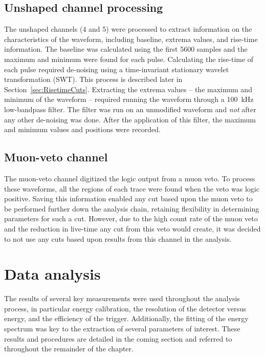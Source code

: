 		\subsection{Unshaped channel processing}
		\label{sec:UnshapedWFProc}

The unshaped channels (4 and 5) were processed to extract information on the characteristics of the waveform, including baseline, extrema values, and rise-time information.    The baseline was calculated using the first 5600 samples and the maximum and minimum were found for each pulse.  Calculating the rise-time of each pulse required de-noising using a time-invariant stationary wavelet transformation (SWT).  This process is described later in Section~\ref{sec:RisetimeCuts}.  Extracting the extrema values -- the maximum and minimum of the waveform -- required running the waveform through a 100~kHz low-bandpass filter.  The filter was run on an unmodified waveform and \emph{not} after any other de-noising was done.  After the application of this filter, the maximum and minimum values and positions were recorded.  

		\subsection{Muon-veto channel}
		\label{sec:MuonProc}

The muon-veto channel digitized the logic output from a muon veto.  To process these waveforms, all the regions of each trace were found when the veto was logic positive.  Saving this information enabled any cut based upon the muon veto to be performed further down the analysis chain, retaining flexibility in determining parameters for such a cut.  However, due to the high count rate of the muon veto and the reduction in live-time any cut from this veto would create, it was decided to not use any cuts based upon results from this channel in the analysis.  


	\section{Data analysis}
	\label{sec:BeGeDataAnalysis}
	
	The results of several key measurements were used throughout the analysis process, in particular energy calibration, the resolution of the detector versus energy, and the efficiency of the trigger.  Additionally, the fitting of the energy spectrum was key to the extraction of several parameters of interest.  These results and procedures are detailed in the coming section and referred to throughout the remainder of the chapter.
	
